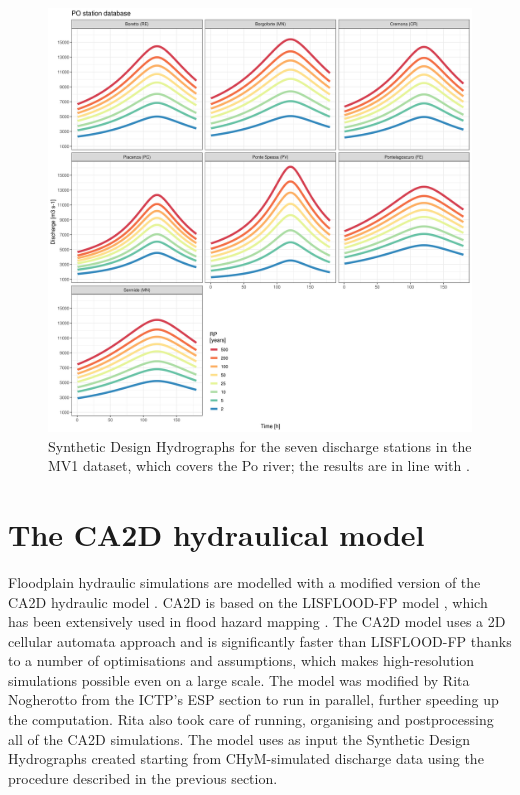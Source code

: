 \begin{figure}
    \centering
    \includegraphics[width=\textwidth]{figures/valid_flood/method/po_sdh}
    \decoRule
    \caption[Synthetic Design Hydrographs for stations in the MV1 dataset]{Synthetic Design Hydrographs for the seven discharge stations in the MV1 dataset, which covers the Po river; the results are in line with \citet{Maione2003}.}
    \label{fig:po_sdh}
\end{figure}


\section{The CA2D hydraulical model}\label{sec:ca2d}
Floodplain hydraulic simulations are modelled with a modified version of the CA2D hydraulic model \citep{Dottori2011,Dottori2010}.
CA2D is based on the LISFLOOD-FP model \citep{Bates2005}, which has been extensively used in flood hazard mapping \citep[see e.g.][]{ThomasStevenSavage2016, Neal2011, Skinner2015}. The CA2D model uses a 2D cellular automata approach and is significantly faster than LISFLOOD-FP thanks to a number of optimisations and assumptions, which makes high-resolution simulations possible even on a large scale.
The model was modified by Rita Nogherotto from the ICTP's ESP section to run in parallel, further speeding up the computation. Rita also took care of running, organising and postprocessing all of the CA2D simulations.
The model uses as input the Synthetic Design Hydrographs created starting from CHyM-simulated discharge data using the procedure described in the previous section.

